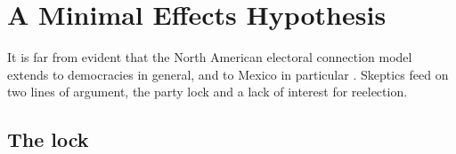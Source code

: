 \documentclass[letter,12pt]{article}
\begin{document}


\section{A Minimal Effects Hypothesis}

It is far from evident that the North American electoral connection model extends to democracies in general, and to Mexico in particular \citep{samuels.2003,jones.etal.amateurLegis.2002}. Skeptics feed on two lines of argument, the party lock and a lack of interest for reelection.

\subsection{The lock}

\end{document}
